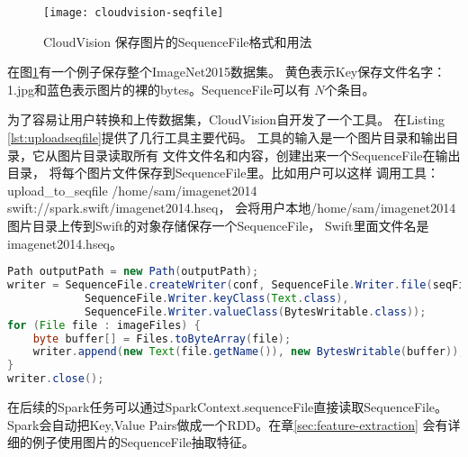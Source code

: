 \begin{figure}[h]
  \centering
    \texttt{[image: cloudvision-seqfile]}
  \caption{CloudVision 保存图片的SequenceFile格式和用法}
  \label{fig:cloudvision-seqfile}
\end{figure}

在图\ref{fig:cloudvision-seqfile}有一个例子保存整个ImageNet2015数据集。
黄色表示Key保存文件名字：1.jpg和蓝色表示图片的裸的bytes。SequenceFile可以有
$N$个条目。

为了容易让用户转换和上传数据集，CloudVision自开发了一个工具。
在Listing \ref{lst:uploadseqfile}提供了几行工具主要代码。
工具的输入是一个图片目录和输出目录，它从图片目录读取所有
文件文件名和内容，创建出来一个SequenceFile在输出目录，
将每个图片文件保存到SequenceFile里。比如用户可以这样
调用工具：
upload\_to\_seqfile /home/sam/imagenet2014 swift://spark.swift/imagenet2014.hseq，
会将用户本地/home/sam/imagenet2014图片目录上传到Swift的对象存储保存一个SequenceFile，
Swift里面文件名是imagenet2014.hseq。

\begin{lstlisting}[language=Java,
                   basicstyle=\tiny,
                   showstringspaces=false,
                   caption={UploadToSequenceFile工具},
                   label={lst:uploadseqfile}]
Path outputPath = new Path(outputPath);
writer = SequenceFile.createWriter(conf, SequenceFile.Writer.file(seqFilePath), 
            SequenceFile.Writer.keyClass(Text.class),
            SequenceFile.Writer.valueClass(BytesWritable.class));
for (File file : imageFiles) {
    byte buffer[] = Files.toByteArray(file);
    writer.append(new Text(file.getName()), new BytesWritable(buffer));
}
writer.close();
\end{lstlisting}

在后续的Spark任务可以通过SparkContext.sequenceFile直接读取SequenceFile。
Spark会自动把Key,Value Pairs做成一个RDD。在章\ref{sec:feature-extraction}
会有详细的例子使用图片的SequenceFile抽取特征。

